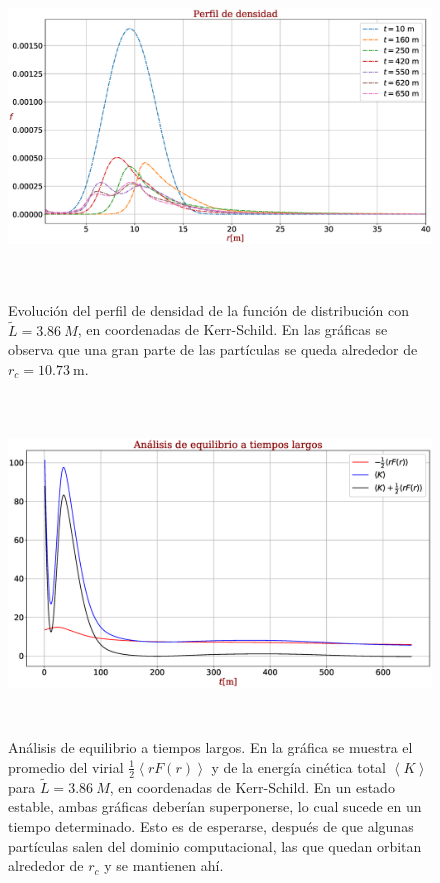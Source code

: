 \documentclass[11pt,twoside,openright,spanish]{report}
\numberwithin{equation}{chapter}
\numberwithin{figure}{chapter}
\numberwithin{table}{chapter}
\begin{document}
\begin{figure}[H]
	\centering
	\includegraphics[height=9cm]{graphs_study/LmayorKSGraphs/densityProfileLmayorKS}
	\caption{Evolución del perfil de densidad de la función de distribución con $\tilde{L}=3.86\ M$, en coordenadas de Kerr-Schild. En las gráficas se observa que una gran parte de las partículas se queda alrededor de $r_c=10.73\ \text{m}$.}
	\label{densityProfileKSLmayor}
\end{figure}

\begin{figure}[H]
	\centering
	\includegraphics[height=9cm]{graphs_study/LmayorKSGraphs/stabilityKSMayor.eps}
	\caption{Análisis de equilibrio a tiempos largos. En la gráfica se muestra el promedio del virial $\frac{1}{2}\left<rF(r)\right>$ y de la energía cinética total $\left<K\right>$ para $\tilde{L}=3.86\ M$, en coordenadas de Kerr-Schild. En un estado estable, ambas gráficas deberían superponerse, lo cual sucede en un tiempo determinado. Esto es de esperarse, después de que algunas partículas salen del dominio computacional, las que quedan orbitan alrededor de $r_c$ y se mantienen ahí.}
	\label{stabilityKSLmayor}
\end{figure}
\end{document}
